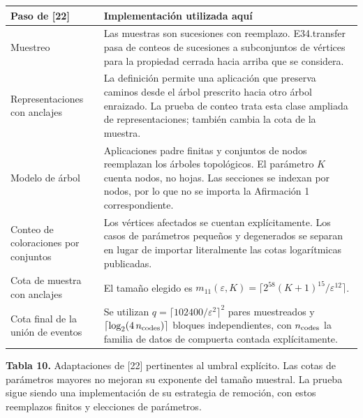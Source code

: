 \documentclass[spanish,11pt,a4paper]{article}
\newcounter{none}
\begin{document}
{\def\LTcaptype{none} %
\begin{longtable}[c]{@{}
  >{\raggedright\arraybackslash}p{}
  >{\raggedright\arraybackslash}p{}@{}}
\toprule\noalign{}
\begin{minipage}[b]{\linewidth}\raggedright
Paso de {[}22{]}
\end{minipage} & \begin{minipage}[b]{\linewidth}\raggedright
Implementación utilizada aquí
\end{minipage} \\
\midrule\noalign{}
\endhead
\bottomrule\noalign{}
\endlastfoot
Muestreo & Las muestras son sucesiones con reemplazo. E34.transfer pasa de conteos de sucesiones a subconjuntos de vértices para la propiedad cerrada hacia arriba que se considera. \\
Representaciones con anclajes & La definición permite una aplicación que preserva caminos desde el árbol prescrito hacia otro árbol enraizado. La prueba de conteo trata esta clase ampliada de representaciones; también cambia la cota de la muestra. \\
Modelo de árbol & Aplicaciones padre finitas y conjuntos de nodos reemplazan los árboles topológicos. El parámetro \(K\) cuenta nodos, no hojas. Las secciones se indexan por nodos, por lo que no se importa la Afirmación 1 correspondiente. \\
Conteo de coloraciones por conjuntos & Los vértices afectados se cuentan explícitamente. Los casos de parámetros pequeños y degenerados se separan en lugar de importar literalmente las cotas logarítmicas publicadas. \\
Cota de muestra con anclajes & El tamaño elegido es \(m_{11}(\varepsilon,K)=\lceil2^{58}(K+1)^{15}/\varepsilon^{12}\rceil\). \\
Cota final de la unión de eventos & Se utilizan \(q=\lceil102400/\varepsilon^2\rceil^2\) pares muestreados y \(\lceil\log_2(4\,n_{\rm codes})\rceil\) bloques independientes, con \(n_{\rm codes}\) la familia de datos de compuerta contada explícitamente. \\
\end{longtable}
}

\textbf{Tabla 10.} Adaptaciones de {[}22{]} pertinentes al umbral explícito. Las cotas de parámetros mayores no mejoran su exponente del tamaño muestral. La prueba sigue siendo una implementación de su estrategia de remoción, con estos reemplazos finitos y elecciones de parámetros.
\end{document}
